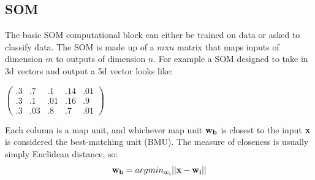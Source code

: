 \documentclass[a4paper,10pt]{article}
\begin{document}
\subsection{SOM}
The basic SOM computational block can either be trained on data or asked to classify data. The SOM
is made up of a $m$x$n$ matrix that maps inputs of dimension $m$ to outputs of dimension $n$.  For
example a SOM designed to take in 3d vectors and output a 5d vector looks like:

\begin{center}
$
\begin{pmatrix}
.3 & .7 & .1  & .14 & .01\\
.3 & .1 & .01 & .16 & .9\\
.3 & .03 & .8 & .7  & .01
\end{pmatrix}
$
\end{center}
Each column is a map unit, and whichever map unit $\bold{w_b}$ is closest to the input $\bold{x}$
is considered the best-matching unit (BMU).  The measure of closeness is usually simply Euclidean
distance, so:
\begin{equation}
 \bold{w_b} = argmin_{w_i} ||\bold{x} - \bold{w_i}||
\end{equation}
 
\end{document}
